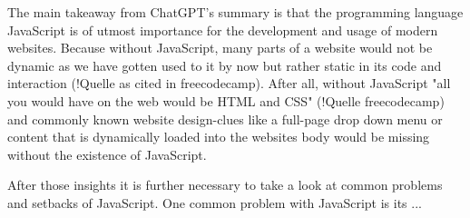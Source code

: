 The main takeaway from ChatGPT's summary is that the programming language JavaScript is of utmost importance for the development and usage of modern websites. Because without JavaScript, many parts of a website would not be dynamic as we have gotten used to it by now but rather static in its code and interaction (!Quelle as cited in freecodecamp). After all, without JavaScript "all you would have on the web would be HTML and CSS" (!Quelle freecodecamp) and commonly known website design-clues like a full-page drop down menu or content that is dynamically loaded into the websites body would be missing without the existence of JavaScript.

After those insights it is further necessary to take a look at common problems and setbacks of JavaScript. One common problem with JavaScript is its ...